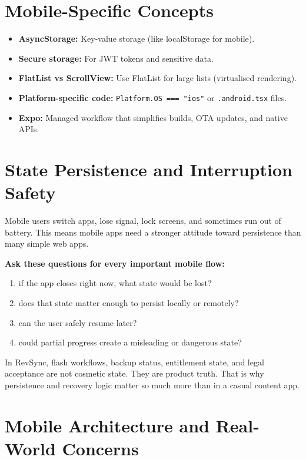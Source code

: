 \documentclass[12pt, a4paper, oneside]{book}
\begin{document}
\section{Mobile-Specific Concepts}
\begin{itemize}[leftmargin=2em]
    \item \textbf{AsyncStorage:} Key-value storage (like localStorage for mobile).
    \item \textbf{Secure storage:} For JWT tokens and sensitive data.
    \item \textbf{FlatList vs ScrollView:} Use FlatList for large lists (virtualised rendering).
    \item \textbf{Platform-specific code:} \texttt{Platform.OS === "ios"} or \texttt{.android.tsx} files.
    \item \textbf{Expo:} Managed workflow that simplifies builds, OTA updates, and native APIs.
\end{itemize}

\section{State Persistence and Interruption Safety}

Mobile users switch apps, lose signal, lock screens, and sometimes run out of battery. This means mobile apps need a stronger attitude toward persistence than many simple web apps.

\textbf{Ask these questions for every important mobile flow:}
\begin{enumerate}[leftmargin=2em]
    \item if the app closes right now, what state would be lost?
    \item does that state matter enough to persist locally or remotely?
    \item can the user safely resume later?
    \item could partial progress create a misleading or dangerous state?
\end{enumerate}

\begin{projectbox}
In RevSync, flash workflows, backup status, entitlement state, and legal acceptance are not cosmetic state. They are product truth. That is why persistence and recovery logic matter so much more than in a casual content app.
\end{projectbox}

\section{Mobile Architecture and Real-World Concerns}
\end{document}
